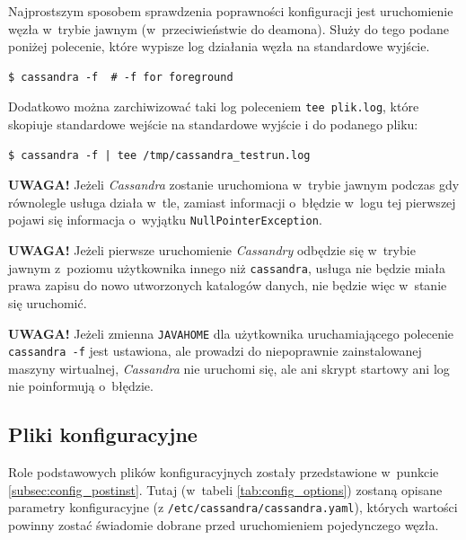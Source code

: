 \documentclass{article} %
\begin{document}
Najprostszym sposobem sprawdzenia poprawności konfiguracji jest uruchomienie węzła w~trybie jawnym (w~przeciwieństwie do deamona).
Służy do tego podane poniżej polecenie, które wypisze log działania węzła na standardowe wyjście.

\begin{lstlisting}[style=bash, caption={testowe uruchamianie \emph{Cassandry}}]
$ cassandra -f  # -f for foreground
\end{lstlisting}

Dodatkowo można zarchiwizować taki log poleceniem \texttt{tee plik.log}, które skopiuje standardowe wejście na standardowe wyjście i do podanego pliku:

\begin{lstlisting}[style=bash, caption={testowe uruchamianie \emph{Cassandry} z archiwizacją logu}]
$ cassandra -f | tee /tmp/cassandra_testrun.log
\end{lstlisting}

\bigskip

\noindent\textbf{UWAGA!} Jeżeli \emph{Cassandra} zostanie uruchomiona w~trybie jawnym podczas gdy równolegle usługa działa w~tle, zamiast informacji o~błędzie w~logu tej pierwszej pojawi się informacja o~wyjątku \texttt{NullPointerException}.

\bigskip

\noindent\textbf{UWAGA!} Jeżeli pierwsze uruchomienie \emph{Cassandry} odbędzie się w~trybie jawnym z~poziomu użytkownika innego niż \texttt{cassandra}, usługa nie będzie miała prawa zapisu do nowo utworzonych katalogów danych, nie będzie więc w~stanie się uruchomić.

\bigskip

\noindent\textbf{UWAGA!} Jeżeli zmienna \texttt{JAVA\textunderscore HOME} dla użytkownika uruchamiającego polecenie \texttt{cassandra~-f} jest ustawiona, ale prowadzi do niepoprawnie zainstalowanej maszyny wirtualnej, \emph{Cassandra} nie uruchomi się, ale ani skrypt startowy ani log nie poinformują o~błędzie.

\subsection{Pliki konfiguracyjne}\label{subsec:config_files}

Role podstawowych plików konfiguracyjnych zostały przedstawione w~punkcie \ref{subsec:config_postinst}.
Tutaj (w~tabeli \ref{tab:config_options}) zostaną opisane parametry konfiguracyjne (z \texttt{/etc/cassandra/cassandra.yaml}), których wartości powinny zostać świadomie dobrane przed uruchomieniem pojedynczego węzła.
\end{document}
